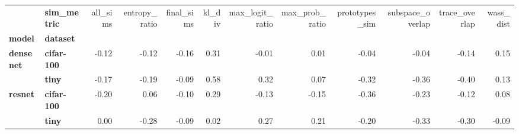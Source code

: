 \begin{tabular}{llrrrrrrrrrr}
\toprule
       & \textbf{sim\_metric} &  all\_sims &  entropy\_ratio &  final\_sims &  kl\_div &  max\_logit\_ratio &  max\_prob\_ratio &  prototypes\_sim &  subspace\_overlap &  trace\_overlap &  wass\_dist \\
\textbf{model} & \textbf{dataset} &           &                &             &         &                  &                 &                 &                   &                &            \\
\midrule
\multirow{2}{*}{\textbf{densenet}} & \textbf{cifar-100} &     -0.12 &          -0.12 &       -0.16 &    0.31 &            -0.01 &            0.01 &           -0.04 &             -0.04 &          -0.14 &       0.15 \\
       & \textbf{tiny} &     -0.17 &          -0.19 &       -0.09 &    0.58 &             0.32 &            0.07 &           -0.32 &             -0.36 &          -0.40 &       0.13 \\
\cline{1-12}
\multirow{2}{*}{\textbf{resnet}} & \textbf{cifar-100} &     -0.20 &           0.06 &       -0.10 &    0.29 &            -0.13 &           -0.15 &           -0.36 &             -0.23 &          -0.12 &       0.08 \\
       & \textbf{tiny} &      0.00 &          -0.28 &       -0.09 &    0.02 &             0.27 &            0.21 &           -0.20 &             -0.33 &          -0.30 &      -0.09 \\
\bottomrule
\end{tabular}
